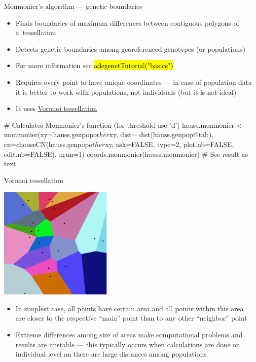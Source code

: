 \documentclass[compress, ucs, xelatex, 11pt, xcolor=svgnames,
  hyperref={
    bookmarks=true,
    unicode=true,
    colorlinks=true,
    pdftitle={Molecular data in R},
    plainpages=false,
    pdfauthor={Vojtech Zeisek},
    pdfsubject={Course about phylogeny and evolution in R},
    pdfcreator={XeLaTeX},
    pdfkeywords={R, evolution, phylogeny, molecular data},
    linkcolor=Tomato,
    anchorcolor=SaddleBrown,
    citecolor=Goldenrod,
    filecolor=DarkMagenta,
    menucolor=Sienna,
    urlcolor=DarkTurquoise,
    pdftex},
  url={hyphens, lowtilde} %
  ]{beamer}
\renewcommand{\texttt}[1]{\hl{\ttfamily #1}}
\begin{document}
\begin{frame}[fragile]{Monmonier's algorithm --- genetic boundaries}
  \begin{itemize}
    \item Finds boundaries of maximum differences between contiguous polygons of a~tessellation
    \item Detects genetic boundaries among georeferenced genotypes (or populations)
    \item For more information see \texttt{adegenetTutorial("basics")}
    \item Requires every point to have unique coordinates --- in case of population data it is better to work with populations, not individuals (but it is not ideal)
    \item It uses \href{https://en.wikipedia.org/wiki/Voronoi_diagram}{Voronoi tessellation}
  \end{itemize}
  \begin{spluscode}
    # Calculates Monmonier's function (for threshold use 'd')
    hauss.monmonier <- monmonier(xy=hauss.genpop$other$xy, dist=
      dist(hauss.genpop@tab), cn=chooseCN(hauss.genpop$other$xy,
      ask=FALSE, type=2, plot.nb=FALSE, edit.nb=FALSE), nrun=1)
    coords.monmonier(hauss.monmonier) # See result as text
  \end{spluscode}
\end{frame}

\begin{frame}{Voronoi tessellation}
  \begin{multicols}{2}
    \includegraphics[height=5.5cm]{voronoi_diagram.png}
    \begin{itemize}
      \item In simplest case, all points have certain area and all points within this area are closer to the respective ``main'' point than to any other ``neighbor'' point
      \item Extreme differences among size of areas make computational problems and results are unstable --- this typically occurs when calculations are done on individual level an there are large distances among populations
    \end{itemize}
  \end{multicols}
\end{frame}
\end{document}
